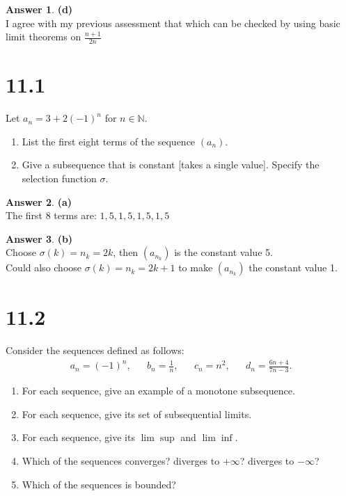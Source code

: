 \documentclass[10pt,a4paper]{article}
\theoremstyle{definition}
\newtheorem*{answer*}{Answer}
\begin{document}
\begin{answer*}{\textbf{(d)}}
\\I agree with my previous assessment that  which can be checked by using basic limit theorems on $\displaystyle \frac{n + 1}{2n}$
\end{answer*}

\section*{11.1}
Let $a_n = 3 + 2(-1)^n$ for $n \in \mathbb{N}$.
\begin{enumerate}[label = (\alph*)]
\item List the first eight terms of the sequence $(a_n)$.
\item Give a subsequence that is constant [takes a single value]. Specify the selection function $\sigma$. 
\end{enumerate}

\begin{answer*}{\textbf{(a)}}
\\The first 8 terms are: $1, 5, 1, 5, 1, 5, 1, 5$
\end{answer*}

\begin{answer*}{\textbf{(b)}}
\\Choose $\sigma(k) = n_k = 2k$, then $(a_{n_k})$ is the constant value 5.
\\Could also choose $\sigma(k) = n_k = 2k + 1$ to make $(a_{n_k})$ the constant value 1.
\end{answer*}

\section*{11.2}
Consider the sequences defined as follows:
\begin{align*}
a_n = (-1)^n, && b_n = \frac{1}{n}, && c_n = n^2, && d_n = \frac{6n + 4}{7n - 3}.
\end{align*}
\begin{enumerate}[label = (\alph*)]
\item For each sequence, give an example of a monotone subsequence.
\item For each sequence, give its set of subsequential limits.
\item For each sequence, give its $\lim \sup$ and $\lim \inf$.
\item Which of the sequences converges? diverges to $+\infty$? diverges to $-\infty$?
\item Which of the sequences is bounded?
\end{enumerate}
\end{document}
